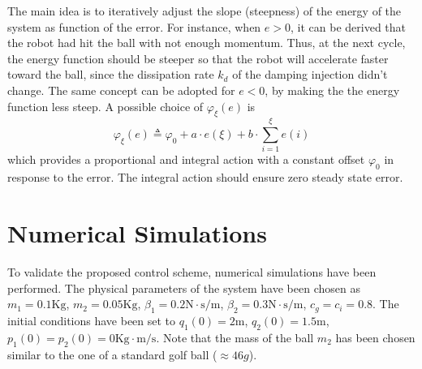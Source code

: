 %
The main idea is to iteratively adjust the slope (steepness) of the energy of the system as function of the error. For instance, when $e>0$, it can be derived that the robot had hit the ball with not enough momentum. Thus, at the next cycle, the energy function should be steeper so that the robot will accelerate faster toward the ball, since the dissipation rate $k_d$ of the damping injection didn't change. The same concept can be adopted for $e<0$, by making the the energy function less steep.
%
A possible choice of $\varphi_\xi(e)$ is
%
\begin{equation}
    \varphi_\xi(e)  \triangleq \varphi_0 + a\cdot e(\xi) + b\cdot\sum_{i = 1}^{\xi}e(i)
\end{equation}
%
which provides a proportional and integral action with a constant offset $\varphi_0$ in response to the error. The integral action should ensure zero steady state error.
%
\section{Numerical Simulations}
%
To validate the proposed control scheme, numerical simulations have been performed. The physical parameters of the system have been chosen as $m_1 = 0.1\text{Kg}$, $m_2 = 0.05\text{Kg}$, $\beta_1 = 0.2\text{N}\cdot \text{s}/\text{m}$, $\beta_2 = 0.3\text{N}\cdot \text{s}/\text{m}$, $c_g = c_i = 0.8$. The initial conditions have been set to $q_1(0) = 2$m, $q_2(0) = 1.5$m, $p_1(0) = p_2(0) = 0\text{Kg}\cdot \text{m}/\text{s}$. Note that the mass of the ball $m_2$ has been chosen similar to the one of a standard golf ball ($\approx 46g$).
